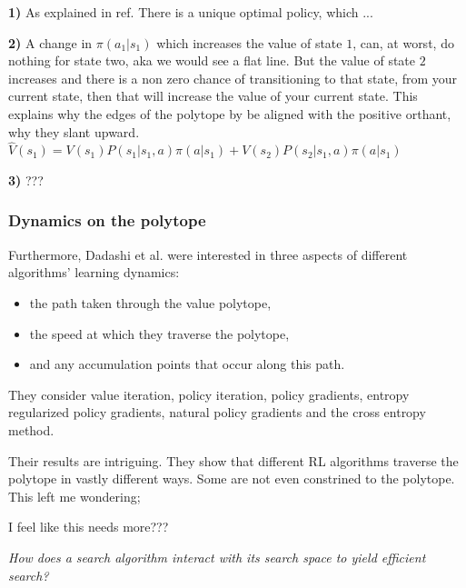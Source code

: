 \textbf{1)} As explained in ref. There is a unique optimal policy, which ...

\textbf{2)} A change in $\pi(a_1|s_1)$ which increases the value of state $1$, can, at worst, do nothing for
state two, aka we would see a flat line. But the value of state $2$
increases and there is a non zero chance of transitioning to that state, from your current state,
then that will increase the value of your current state.
This explains why the edges of the polytope by be aligned with the positive orthant, why they slant upward. $\hat V(s_1) = V(s_1)P(s_1|s_1, a)\pi(a|s_1) + V(s_2)P(s_2|s_1, a)\pi(a|s_1)$


\textbf{3)} ???





\subsubsection{Dynamics on the polytope}

Furthermore, Dadashi et al. \cite{Dadashi2018} were interested in three aspects of different algorithms’ learning dynamics:

\begin{itemize}
\tightlist
  \item the path taken through the value polytope,
  \item the speed at which they traverse the polytope,
  \item and any accumulation points that occur along this path.
\end{itemize}


They consider value iteration, policy iteration, policy gradients, entropy regularized policy gradients,
natural policy gradients and the cross entropy method.

Their results are intriguing. They show that different RL algorithms traverse the polytope in vastly different ways.
Some are not even constrined to the polytope. This left me wondering;

{\color{red}I feel like this needs more???}

\begin{displayquote}
  \textit{How does a search algorithm interact with its search space to yield efficient search?}
\end{displayquote}

